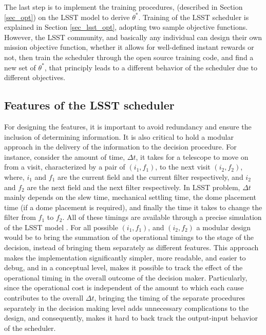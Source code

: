 \documentclass[12pt,aas_macros]{article}
\theoremstyle{definition}
\begin{document}
The last step is to implement the training procedures, (described in Section \ref{sec_opt}) on the LSST model to derive $\theta^*$. Training of the LSST scheduler is explained in Section \ref{sec_lsst_opt}, adopting two sample objective functions. However, the LSST community, and basically any individual can design their own mission objective function, whether it allows for well-defined instant rewards or not, then train the scheduler through the open source training code, and find a new set of $\theta^*$, that principly leads to a different behavior of the scheduler due to different objectives.


\subsection{Features of the LSST scheduler}\label{sec_lsst_features}

For designing the features, it is important to avoid redundancy and ensure the inclusion of determining information. It is also critical to hold a modular approach in the delivery of the information to the decision procedure. For instance, consider the amount of time, $\Delta t$, it takes for a telescope to move on from a visit, characterized by a pair of $(i_1,f_1)$, to the next visit $(i_2,f_2)$,  where, $i_1$ and $f_1$ are the current field and the current filter respectively, and $i_2$ and $f_2$ are the next field and the next filter respectively. In LSST problem, $\Delta t$ mainly depends on the slew time, mechanical settling time, the dome placement time (if a dome placement is required), and finally the time it takes to change the filter from $f_1$ to $f_2$. All of these timings are available through a precise simulation of the LSST model \cite{delgado2014lsst}. For all possible $(i_1,f_1)$, and $(i_2,f_2)$ a modular design would be to bring the summation of the operational timings to the stage of the decision, instead of bringing them separately as different features. This approach makes the implementation significantly simpler, more readable, and easier to debug, and in a conceptual level, makes it possible to track the effect of the operational timing in the overall outcome of the decision maker. Particularly, since the operational cost is independent of the amount to which each cause contributes to the overall $\Delta t$, bringing the timing of the separate procedures separately in the decision making level adds unnecessary complications to the design, and consequently, makes it hard to back track the output-input behavior of the scheduler. 
\end{document}
